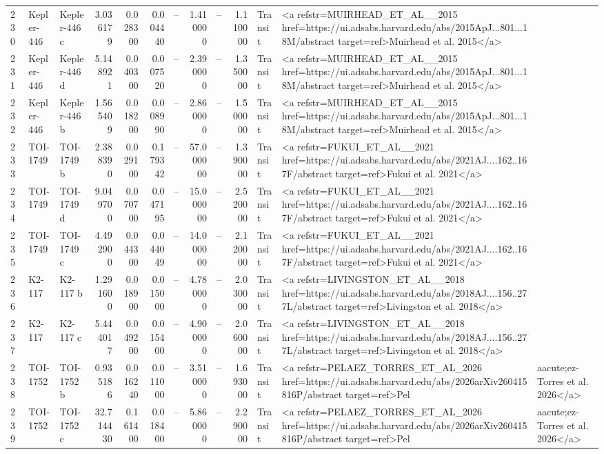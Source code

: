\begin{tabular}{lllrrrrrrrll}
230 & Kepler-446 & Kepler-446 c & 3.036179 & 0.028300 & 0.004440 & -- & 1.410000 & -- & 1.110000 & Transit & <a refstr=MUIRHEAD_ET_AL__2015 href=https://ui.adsabs.harvard.edu/abs/2015ApJ...801...18M/abstract target=ref>Muirhead et al. 2015</a> \\
231 & Kepler-446 & Kepler-446 d & 5.148921 & 0.040300 & 0.007520 & -- & 2.390000 & -- & 1.350000 & Transit & <a refstr=MUIRHEAD_ET_AL__2015 href=https://ui.adsabs.harvard.edu/abs/2015ApJ...801...18M/abstract target=ref>Muirhead et al. 2015</a> \\
232 & Kepler-446 & Kepler-446 b & 1.565409 & 0.018200 & 0.008990 & -- & 2.860000 & -- & 1.500000 & Transit & <a refstr=MUIRHEAD_ET_AL__2015 href=https://ui.adsabs.harvard.edu/abs/2015ApJ...801...18M/abstract target=ref>Muirhead et al. 2015</a> \\
233 & TOI-1749 & TOI-1749 b & 2.388390 & 0.029100 & 0.179342 & -- & 57.000000 & -- & 1.390000 & Transit & <a refstr=FUKUI_ET_AL__2021 href=https://ui.adsabs.harvard.edu/abs/2021AJ....162..167F/abstract target=ref>Fukui et al. 2021</a> \\
234 & TOI-1749 & TOI-1749 d & 9.049700 & 0.070700 & 0.047195 & -- & 15.000000 & -- & 2.520000 & Transit & <a refstr=FUKUI_ET_AL__2021 href=https://ui.adsabs.harvard.edu/abs/2021AJ....162..167F/abstract target=ref>Fukui et al. 2021</a> \\
235 & TOI-1749 & TOI-1749 c & 4.492900 & 0.044300 & 0.044049 & -- & 14.000000 & -- & 2.120000 & Transit & <a refstr=FUKUI_ET_AL__2021 href=https://ui.adsabs.harvard.edu/abs/2021AJ....162..167F/abstract target=ref>Fukui et al. 2021</a> \\
236 & K2-117 & K2-117 b & 1.291600 & 0.018900 & 0.015000 & -- & 4.780000 & -- & 2.030000 & Transit & <a refstr=LIVINGSTON_ET_AL__2018 href=https://ui.adsabs.harvard.edu/abs/2018AJ....156..277L/abstract target=ref>Livingston et al. 2018</a> \\
237 & K2-117 & K2-117 c & 5.444017 & 0.049200 & 0.015400 & -- & 4.900000 & -- & 2.060000 & Transit & <a refstr=LIVINGSTON_ET_AL__2018 href=https://ui.adsabs.harvard.edu/abs/2018AJ....156..277L/abstract target=ref>Livingston et al. 2018</a> \\
238 & TOI-1752 & TOI-1752 b & 0.935186 & 0.016240 & 0.011000 & -- & 3.510000 & -- & 1.693000 & Transit & <a refstr=PELAEZ_TORRES_ET_AL_2026 href=https://ui.adsabs.harvard.edu/abs/2026arXiv260415816P/abstract target=ref>Pel&aacute;ez-Torres et al. 2026</a> \\
239 & TOI-1752 & TOI-1752 c & 32.714430 & 0.161400 & 0.018400 & -- & 5.860000 & -- & 2.290000 & Transit & <a refstr=PELAEZ_TORRES_ET_AL_2026 href=https://ui.adsabs.harvard.edu/abs/2026arXiv260415816P/abstract target=ref>Pel&aacute;ez-Torres et al. 2026</a> \\

\end{tabular}
